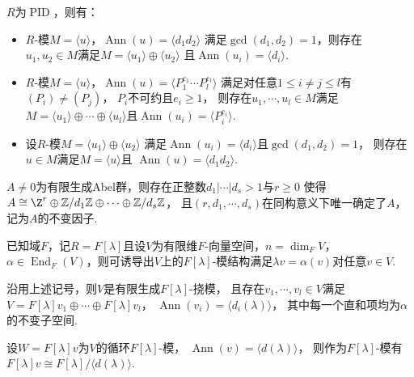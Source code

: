     \begin{theorem}
        $R$为$\operatorname{PID}$，则有：
        \begin{itemize}
        \item[(1)] $R$-模$M=\langle u\rangle$，$\operatorname{Ann}(u)=\langle d_1d_2 \rangle$
        满足$\gcd(d_1,d_2)=1$，则存在$u_1,u_2\in M$满足$M=\langle u_1\rangle\oplus\langle u_2 \rangle$
        且$\operatorname{Ann}(u_i)=\langle d_i\rangle$.\\
        \item[(2)] $R$-模$M=\langle u\rangle$，$\operatorname{Ann}(u)=\langle P_1^{e_1}\cdots P_l^{e_l} \rangle$
        满足对任意$1 \leq i\neq j\leq l$有$(P_i)\neq (P_j)$，
        $P_i$不可约且$e_i\geq 1$，
        则存在$u_1,\cdots,u_l\in M$满足$M=\langle u_1\rangle\oplus\cdots\oplus\langle u_l \rangle$且$\operatorname{Ann}(u_i)=\langle P_i^{e_i} \rangle$.\\
        \item[(3)] 设$R$-模$M=\langle u_1\rangle\oplus\langle u_2 \rangle$
        满足$\operatorname{Ann}(u_i)=\langle d_i\rangle$且$\gcd(d_1,d_2)=1$，
        则存在$u\in M$满足$M=\langle u\rangle$且
        $\operatorname{Ann}(u)=\langle d_1d_2 \rangle$.
        \end{itemize}
    \end{theorem}
    \begin{example}
        $A\neq 0$为有限生成Abel群，则存在正整数$d_1|\cdots|d_s>1$与$r\geq 0$
        使得$A \cong \Z^r\oplus \mathbb{Z}/d_1\mathbb{Z}\oplus\cdots \oplus\mathbb{Z}/d_s\mathbb{Z}$，
        且$(r,d_1,\cdots,d_s)$在同构意义下唯一确定了$A$，记为$A$的不变因子.
    \end{example}
    \begin{definition}
        已知域$F$，记$R=F[\lambda]$且设$V$为有限维$F$-向量空间，$n=\operatorname{dim}_FV$，$\alpha \in \operatorname{End}_F(V)$，则可诱导出$V$上的$F[\lambda]$-模结构满足$\lambda v=\alpha(v)$对任意$v \in V$.
    \end{definition}
    \begin{proposition}
        沿用上述记号，则$V$是有限生成$F[\lambda]$-挠模，
        且存在$v_1,\cdots,v_l \in V$满足
        $V=F[\lambda]v_1\oplus\cdots \oplus F[\lambda]v_l$，
        $\operatorname{Ann}(v_i)=\langle d_i(\lambda) \rangle$，
        其中每一个直和项均为$\alpha$的不变子空间.
    \end{proposition}
    \begin{proposition}
        设$W=F[\lambda]v$为$V$的循环$F[\lambda]$-模，
        $\operatorname{Ann}(v)=\langle d(\lambda)\rangle$，
        则作为$F[\lambda]$-模有
        $F[\lambda]v \cong F[\lambda]/\langle d(\lambda)\rangle$.
    \end{proposition}
